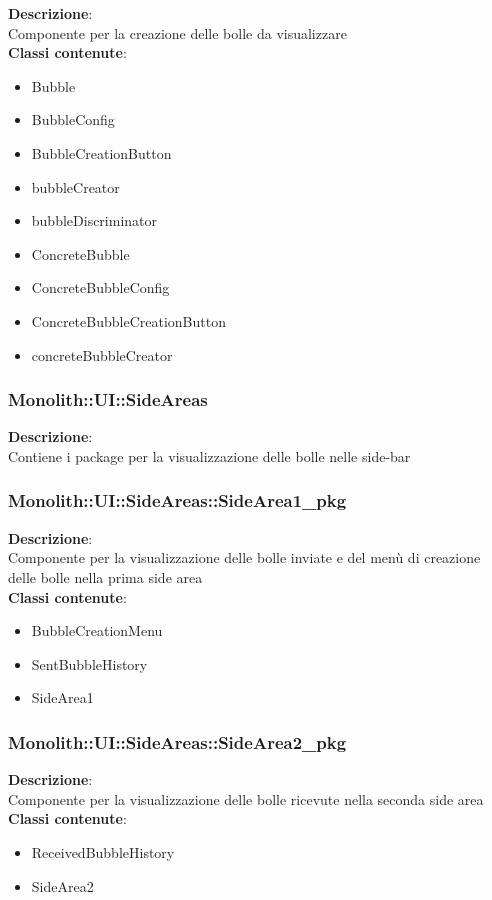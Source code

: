 \FloatBarrier
\textbf{Descrizione}:\\
 Componente per la creazione delle bolle da visualizzare 
\\ \textbf{Classi contenute}:\\
\begin{itemize}
\item Bubble
\item BubbleConfig
\item BubbleCreationButton
\item bubbleCreator
\item bubbleDiscriminator
\item ConcreteBubble
\item ConcreteBubbleConfig
\item ConcreteBubbleCreationButton
\item concreteBubbleCreator
\end{itemize}


\clearpage

\subsubsection{Monolith::UI::SideAreas}
\textbf{Descrizione}:\\
 Contiene i package per la visualizzazione delle bolle nelle side-bar 


\clearpage

\subsubsection{Monolith::UI::SideAreas::SideArea1\_pkg}
\textbf{Descrizione}:\\
 Componente per la visualizzazione delle bolle inviate e del menù di creazione delle bolle nella prima side area 
\\ \textbf{Classi contenute}:\\
\begin{itemize}
\item BubbleCreationMenu
\item SentBubbleHistory
\item SideArea1
\end{itemize}


\clearpage

\subsubsection{Monolith::UI::SideAreas::SideArea2\_pkg}
\textbf{Descrizione}:\\
 Componente per la visualizzazione delle bolle ricevute nella seconda side area 
\\ \textbf{Classi contenute}:\\
\begin{itemize}
\item ReceivedBubbleHistory
\item SideArea2
\end{itemize}


